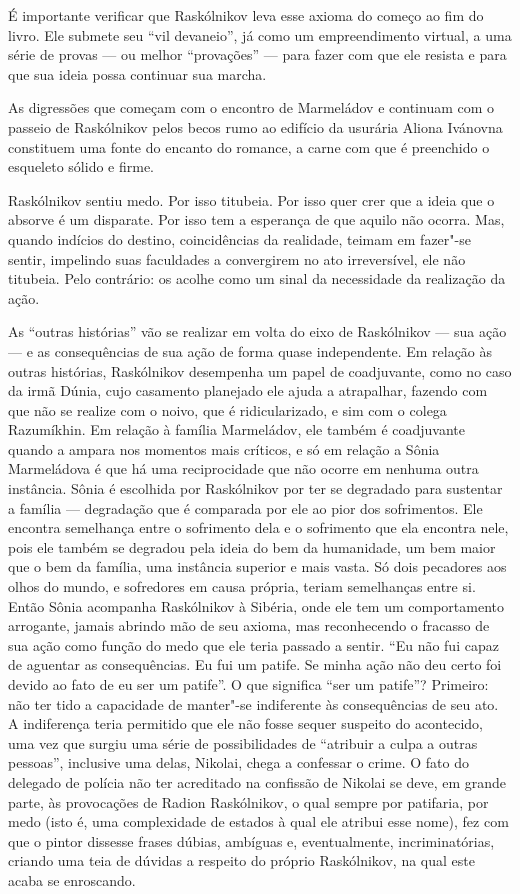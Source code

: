 {{É importante verificar que Raskólnikov leva esse axioma do começo ao fim
do livro. Ele submete seu ``vil devaneio'', já como um empreendimento
virtual, a uma série de provas --- ou melhor ``provações'' --- para fazer
com que ele resista e para que sua ideia possa continuar sua marcha.

As digressões que começam com o encontro de Marmeládov e continuam com o
passeio de Raskólnikov pelos becos rumo ao edifício da usurária Aliona
Ivánovna constituem uma fonte do encanto do romance, a carne com que é
preenchido o esqueleto sólido e firme.

Raskólnikov sentiu medo. Por isso titubeia. Por isso quer crer que a
ideia que o absorve é um disparate. Por isso tem a esperança de que
aquilo não ocorra. Mas, quando indícios do destino, coincidências da
realidade, teimam em fazer"-se sentir, impelindo suas faculdades a
convergirem no ato irreversível, ele não titubeia. Pelo contrário: os
acolhe como um sinal da necessidade da realização da ação.

As ``outras histórias'' vão se realizar em volta do eixo de Raskólnikov
--- sua ação --- e as consequências de sua ação de forma quase
independente. Em relação às outras histórias, Raskólnikov desempenha um
papel de coadjuvante, como no caso da irmã Dúnia, cujo casamento
planejado ele ajuda a atrapalhar, fazendo com que não se realize com o
noivo, que é ridicularizado, e sim com o colega Razumíkhin. Em relação à
família Marmeládov, ele também é coadjuvante quando a ampara nos
momentos mais críticos, e só em relação a Sônia Marmeládova é que há uma
reciprocidade que não ocorre em nenhuma outra instância. Sônia é
escolhida por Raskólnikov por ter se degradado para sustentar a família
--- degradação que é comparada por ele ao pior dos sofrimentos. Ele
encontra semelhança entre o sofrimento dela e o sofrimento que ela
encontra nele, pois ele também se degradou pela ideia do bem da
humanidade, um bem maior que o bem da família, uma instância superior e
mais vasta. Só dois pecadores aos olhos do mundo, e sofredores em causa
própria, teriam semelhanças entre si. Então Sônia acompanha Raskólnikov
à Sibéria, onde ele tem um comportamento arrogante, jamais abrindo mão
de seu axioma, mas reconhecendo o fracasso de sua ação como função do
medo que ele teria passado a sentir. ``Eu não fui capaz de aguentar as
consequências. Eu fui um patife. Se minha ação não deu certo foi devido
ao fato de eu ser um patife''. O que significa ``ser um patife''?
Primeiro: não ter tido a capacidade de manter"-se indiferente às
consequências de seu ato. A indiferença teria permitido que ele não
fosse sequer suspeito do acontecido, uma vez que surgiu uma série de
possibilidades de ``atribuir a culpa a outras pessoas'', inclusive uma
delas, Nikolai, chega a confessar o crime. O fato do delegado de
polícia não ter acreditado na confissão de Nikolai se deve, em grande
parte, às provocações de Radion Raskólnikov, o qual sempre por
patifaria, por medo (isto é, uma complexidade de estados à qual ele
atribui esse nome), fez com que o pintor dissesse frases dúbias,
ambíguas e, eventualmente, incriminatórias, criando uma teia de dúvidas
a respeito do próprio Raskólnikov, na qual este acaba se enroscando.

}}
